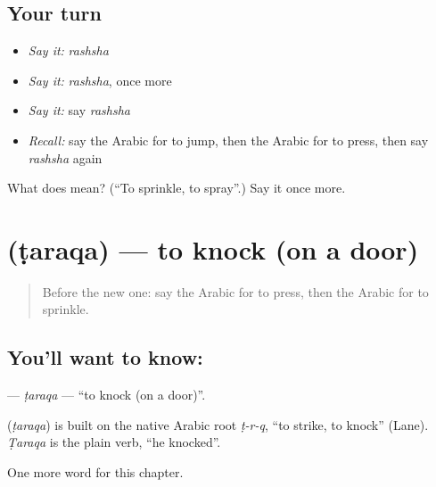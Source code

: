 \subsection*{Your turn}
\begin{itemize}
\raggedright
  \item \emph{Say it:} \emph{rashsha}
  \item \emph{Say it:} \emph{rashsha}, once more
  \item \emph{Say it:} say \emph{rashsha}
  \item \emph{Recall:} say the Arabic for to jump, then the Arabic for to press, then say \emph{rashsha} again
\end{itemize}

\begin{tcolorbox}[breakable,colback=teal!4,colframe=teal!35!black,title={Before you move on}]
What does  mean? (\textquotedblleft{}To sprinkle, to spray\textquotedblright{}.) Say it once more.
\end{tcolorbox}
\section[\texorpdfstring{\ar{طرق} (ṭaraqa)}{طرق (ṭaraqa)}]{ (ṭaraqa) — to knock (on a door)}

\label{lesson:AR-C260-taraqa}



\begin{quote}
Before the new one: say the Arabic for to press, then the Arabic for to sprinkle.
\end{quote}

\subsection*{You'll want to know: }
\textbf{} — \emph{ṭaraqa} — \textquotedblleft{}to knock (on a door)\textquotedblright{}.

\begin{cousinweb}
\textbf{} (\emph{ṭaraqa}) is built on the native Arabic root \emph{ṭ-r-q}, \textquotedblleft{}to strike, to knock\textquotedblright{} (Lane). \emph{Ṭaraqa} is the plain verb, \textquotedblleft{}he knocked\textquotedblright{}.
\end{cousinweb}

\begin{grammarlens}[title={What you've built}]
One more word for this chapter.
\end{grammarlens}


